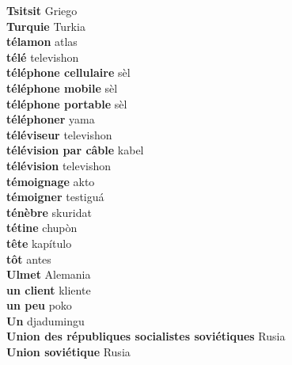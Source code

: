 \textbf{ Tsitsit  } Griego \\
\textbf{ Turquie  } Turkia \\
\textbf{ télamon  } atlas \\
\textbf{ télé  } televishon \\
\textbf{ téléphone cellulaire  } sèl \\
\textbf{ téléphone mobile  } sèl \\
\textbf{ téléphone portable  } sèl \\
\textbf{ téléphoner  } yama \\
\textbf{ téléviseur  } televishon \\
\textbf{ télévision par câble  } kabel \\
\textbf{ télévision  } televishon \\
\textbf{ témoignage  } akto \\
\textbf{ témoigner  } testiguá \\
\textbf{ ténèbre  } skuridat \\
\textbf{ tétine  } chupòn \\
\textbf{ tête  } kapítulo \\
\textbf{ tôt  } antes \\
\textbf{ Ulmet  } Alemania \\
\textbf{ un client  } kliente \\
\textbf{ un peu  } poko \\
\textbf{ Un  } djadumingu \\
\textbf{ Union des républiques socialistes soviétiques  } Rusia \\
\textbf{ Union soviétique  } Rusia \\

